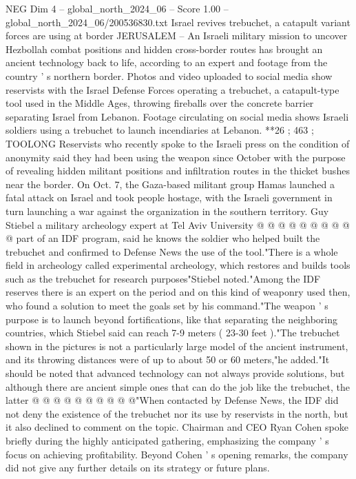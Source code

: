 \begin{textsample}{NEG Dim 4 – global\_north\_2024\_06 – Score 1.00 – global\_north\_2024\_06/200536830.txt}  \label{ex:f4_neg_316}
Israel revives trebuchet, a catapult variant forces are using at border JERUSALEM -- An Israeli military mission to uncover Hezbollah combat positions and hidden cross-border routes has brought an ancient technology back to life, according to an expert and footage from the country ' s northern border.
Photos and video uploaded to social media show reservists with the Israel Defense Forces operating a trebuchet, a catapult-type tool used in the Middle Ages, throwing fireballs over the concrete barrier separating Israel from Lebanon.
Footage circulating on social media shows Israeli soldiers using a trebuchet to launch incendiaries at Lebanon. **26 ; 463 ; TOOLONG Reservists who recently spoke to the Israeli press on the condition of anonymity said they had been using the weapon since October with the purpose of revealing hidden militant positions and infiltration routes in the thicket bushes near the border.
On Oct. 7, the Gaza-based militant group Hamas launched a fatal attack on Israel and took people hostage, with the Israeli government in turn launching a war against the organization in the southern territory.
Guy Stiebel a military archeology expert at Tel Aviv University @ @ @ @ @ @ @ @ @ @ part of an IDF program, said he knows the soldier who helped built the trebuchet and confirmed to Defense News the use of the tool."There is a whole field in archeology called experimental archeology, which restores and builds tools such as the trebuchet for research purposes"Stiebel noted."Among the IDF reserves there is an expert on the period and on this kind of weaponry used then, who found a solution to meet the goals set by his command."The weapon ' s purpose is to launch beyond fortifications, like that separating the neighboring countries, which Stiebel said can reach 7-9 meters ( 23-30 feet )."The trebuchet shown in the pictures is not a particularly large model of the ancient instrument, and its throwing distances were of up to about 50 or 60 meters,"he added."It should be noted that advanced technology can not always provide solutions, but although there are ancient simple ones that can do the job like the trebuchet, the latter @ @ @ @ @ @ @ @ @ @"When contacted by Defense News, the IDF did not deny the existence of the trebuchet nor its use by reservists in the north, but it also declined to comment on the topic.
Chairman and CEO Ryan Cohen spoke briefly during the highly anticipated gathering, emphasizing the company ' s focus on achieving profitability.
Beyond Cohen ' s opening remarks, the company did not give any further details on its strategy or future plans.

\end{textsample}
